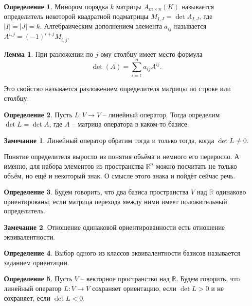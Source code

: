 \documentclass[10pt,a4paper,oneside]{book} %
\theoremstyle{definition}
\newtheorem*{rem}{Замечание}
\newtheorem*{defn}{Определение}
\newtheorem{lem}{Лемма}
\newcommand{\mb}[1]{\mathbb{#1}}
\newcommand{\ovl}{\overline}
\def\dfn{\begin{defn}}
\def\edfn{\end{defn}}
\def\lm{\begin{lem}}
\def\elm{\end{lem}}
\def\rm{\begin{rem}}
\def\erm{\end{rem}}
\begin{document}
\dfn Минором порядка $k$ матрицы $A_{m\times n}(K)$ называется определитель некоторой квадратной подматрицы $M_{I,J}=\det A_{I,J}$, где $|I|=|J|=k$. Алгебраическим дополнением элемента $a_{ij}$ называется $A^{i,j}=(-1)^{i+j} M_{\ovl{i},\ovl{j}}$.
\edfn

\lm При разложении по $j$-ому столбцу имеет место формула  $$\det(A)=\sum_{i=1}^n a_{ij} A^{ij}.$$
\elm
Это свойство называется разложением  определителя матрицы по строке или столбцу.

\dfn Пусть $L\colon V \to V$ -- линейный оператор. Тогда определим $\det L=\det A$, где $A$ -- матрица оператора в каком-то базисе.
\edfn

\rm Линейный оператор обратим тогда и только тогда, когда $\det L \neq 0$.
\erm




Понятие определителя выросло из понятия объёма и немного его переросло. А именно, для набора элементов из пространства $\mb R^n$ можно посчитать не только объём, но ещё и некоторый знак. О смысле этого знака и пойдёт сейчас речь. 

\dfn  Будем говорить, что два базиса пространства $V$ над $\mb R$ одинаково ориентированы, если матрица перехода между ними имеет положительный определитель.
\edfn

\rm Отношение одинаковой ориентированности есть отношение эквивалентности.
\erm

\dfn Выбор одного из классов эквивалентности базисов называется заданием ориентации.
\edfn

\dfn Пусть $V$ -- векторное пространство над $\mb R$. Будем говорить, что линейный оператор $L\colon V \to V$ сохраняет ориентацию, если $\det L >0$ и не сохраняет, если $\det L<0$.
\edfn
\end{document}
